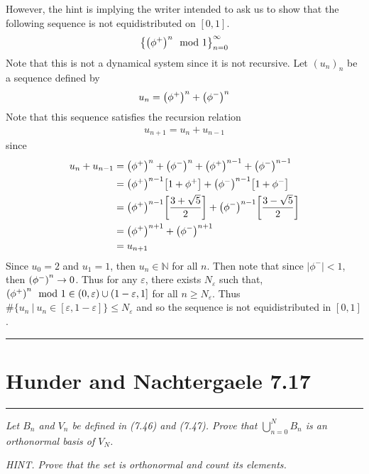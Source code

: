 \documentclass{article} %
\theoremstyle{plain}
\newcommand{\E}{\varepsilon}
\newcommand{\problem}[1]{
\vspace{.375cm}
\begin{minipage}{\textwidth}
    \begin{center}
        \noindent\rule{5cm}{1pt}
    \end{center}
    \section{\bf #1}
    \begin{center}
        \noindent\rule{5cm}{1pt}
    \end{center}
    \vspace{0.25cm}
\end{minipage}
}
\numberwithin{equation}{section} %
\numberwithin{figure}{section} %
\numberwithin{table}{section} %
\begin{document}
However, the hint is implying the writer intended to ask us to show that the following sequence is not equidistributed on $[0,1]$.
\begin{align*}
    \left\{\qty(\phi^+)^n\mod 1\right\}_{n=0}^\infty
\end{align*}
Note that this is not a dynamical system since it is not recursive.  Let $(u_n)_n$ be a sequence defined by
\begin{align*}
    u_n = \qty(\phi^+)^n + \qty(\phi^-)^n
\end{align*}
Note that this sequence satisfies the recursion relation
\begin{align*}
    u_{n+1} = u_n + u_{n-1}
\end{align*}
since
\begin{align*}
    u_n + u_{n-1} &= \qty(\phi^+)^n + \qty(\phi^-)^n + \qty(\phi^+)^{n-1} + \qty(\phi^-)^{n-1} \\
    &= \qty(\phi^+)^{n-1}\qty[1 + \phi^+] + \qty(\phi^-)^{n-1}\qty[1 + \phi^-] \\
    &= \qty(\phi^+)^{n-1}\qty[\frac{3 + \sqrt{5}}{2}] + \qty(\phi^-)^{n-1}\qty[\frac{3 - \sqrt{5}}{2}] \\
    &= \qty(\phi^+)^{n+1} + \qty(\phi^-)^{n+1} \\
    &= u_{n+1}
\end{align*}
Since $u_0 = 2$ and $u_1 = 1$, then $u_n \in \mathbb{N}$ for all $n$.  Then note that since $\left|\phi^-\right| < 1$, then $\qty(\phi^-)^n \rightarrow 0$.  Thus for any $\E$, there exists $N_\E$ such that, $\qty(\phi^+)^n \mod 1 \in (0, \E) \cup (1 - \E, 1]$ for all $n \geq N_\E$.  Thus $\#\{u_n\ |\ u_n \in [\E, 1 - \E]\} \leq N_\E$ and so the sequence is not equidistributed in $[0,1]$.

\problem{Hunder and Nachtergaele 7.17}
\emph{Let $B_n$ and $V_n$ be defined in (7.46) and (7.47).  Prove that $\bigcup_{n=0}^N B_n$ is an orthonormal basis of $V_N$.}

\emph{HINT.  Prove that the set is orthonormal and count its elements.} \\
\end{document}
